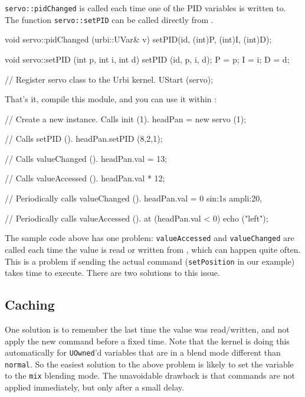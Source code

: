 \lstinline{servo::pidChanged} is called each time one of the PID
variables is written to. The function \lstinline{servo::setPID} can be
called directly from \urbi.

\begin{cxx}
void
servo::pidChanged (urbi::UVar& v)
{
  setPID(id, (int)P, (int)I, (int)D);
}

void
servo::setPID (int p, int i, int d)
{
  setPID (id, p, i, d);
  P = p;
  I = i;
  D = d;
}

// Register servo class to the Urbi kernel.
UStart (servo);
\end{cxx}

That's it, compile this module, and you can use it within \us:

\begin{urbiunchecked}
// Create a new instance.  Calls init (1).
headPan = new servo (1);

// Calls setPID ().
headPan.setPID (8,2,1);

// Calls valueChanged ().
headPan.val = 13;

// Calls valueAccessed ().
headPan.val * 12;

// Periodically calls valueChanged ().
headPan.val = 0 sin:1s ampli:20,

// Periodically calls valueAccessed ().
at (headPan.val < 0)
  echo ("left");
\end{urbiunchecked}

The sample code above has one problem: \lstinline{valueAccessed} and
\lstinline{valueChanged} are called each time the value is read or
written from \urbi, which can happen quite often. This is a problem if
sending the actual command (\lstinline{setPosition} in our example)
takes time to execute. There are two solutions to this issue.

\subsection{Caching}

One solution is to remember the last time the value was read/written,
and not apply the new command before a fixed time. Note that the
kernel is doing this automatically for \lstinline{UOwned}'d variables
that are in a blend mode different than \lstinline{normal}. So the
easiest solution to the above problem is likely to set the variable to
the \lstinline{mix} blending mode. The unavoidable drawback is that
commands are not applied immediately, but only after a small delay.

